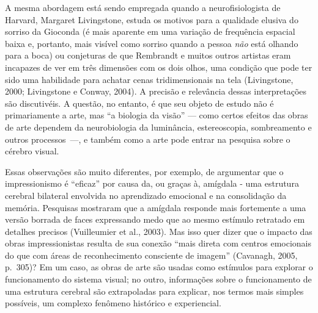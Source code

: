 A mesma abordagem está sendo empregada quando a neurofisiologista de
Harvard, Margaret Livingstone, estuda os motivos para a qualidade
elusiva do sorriso da Gioconda (é mais aparente em uma variação de
frequência espacial baixa e, portanto, mais visível como sorriso quando
a pessoa \emph{não} está olhando para a boca) ou conjeturas de que
Rembrandt e muitos outros artistas eram incapazes de ver em três
dimensões com os dois olhos, uma condição que pode ter sido uma
habilidade para achatar cenas tridimensionais na tela (Livingstone,
2000; Livingstone e Conway, 2004). A precisão e relevância dessas
interpretações são discutivéis. A questão, no entanto, é que seu objeto
de estudo não é primariamente a arte, mas ``a biologia da visão'' ---
como certos efeitos das obras de arte dependem da neurobiologia da
luminância, estereoscopia, sombreamento e outros processos~---, e também
como a arte pode entrar na pesquisa sobre o cérebro visual.

Essas observações são muito diferentes, por exemplo, de argumentar que o
impressionismo é ``eficaz'' por causa da, ou graças à, amígdala - uma
estrutura cerebral bilateral envolvida no aprendizado emocional e na
consolidação da memória. Pesquisas mostraram que a amígdala responde
mais fortemente a uma versão borrada de faces expressando medo que ao
mesmo estímulo retratado em detalhes precisos (Vuilleumier et al.,
2003). Mas isso quer dizer que o impacto das obras impressionistas
resulta de sua conexão ``mais direta com centros emocionais do que com
áreas de reconhecimento consciente de imagem'' (Cavanagh, 2005, p.~305)?
Em um caso, as obras de arte são usadas como estímulos para explorar o
funcionamento do sistema visual; no outro, informações sobre o
funcionamento de uma estrutura cerebral são extrapoladas para explicar,
nos termos mais simples possíveis, um complexo fenômeno histórico e
experiencial.

